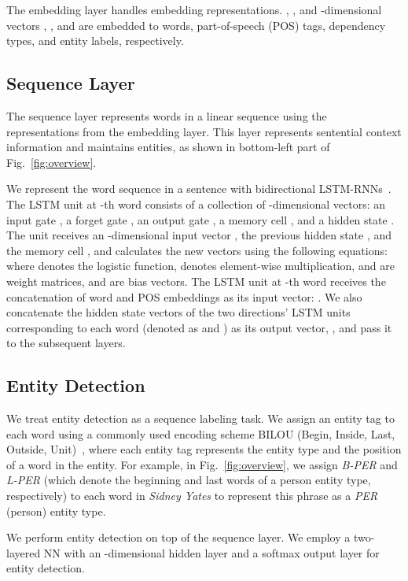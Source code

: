 \documentclass[11pt]{article}
\begin{document}
The embedding layer handles embedding representations. , ,  and -dimensional vectors , ,  and  are
embedded to words, part-of-speech (POS) tags, dependency types, and entity labels, respectively. 

\subsection{Sequence Layer}

The sequence layer represents words in a linear sequence using the representations from the embedding layer. This layer represents sentential context information and maintains entities, as shown in bottom-left part of Fig.~\ref{fig:overview}.

We represent the word sequence in a sentence with bidirectional LSTM-RNNs~\cite{graves2013speech}.
The LSTM unit at -th word consists of a collection of -dimensional
vectors: an input gate , a forget gate , an output gate , a
memory cell , and a hidden state .
The unit receives an -dimensional input vector , the previous hidden state , and the memory cell , and calculates the new vectors using the following equations:
\vspace{-0.15cm}
where  denotes the logistic function,  denotes element-wise multiplication,  and  are weight matrices, and  are bias vectors.
The LSTM unit at -th word receives the concatenation of word and POS embeddings as its input vector: .
We also concatenate the hidden state vectors of the two directions' LSTM units corresponding to each word (denoted as  and ) as its output vector, , and pass it to the subsequent layers.

\subsection{Entity Detection}

We treat entity detection as a sequence labeling task. We assign an entity tag to each word using a commonly used encoding scheme BILOU (Begin, Inside, Last, Outside, Unit)~\cite{ratinov-roth:2009:CoNLL}, where each entity tag represents the entity type and the position of a word in the entity. For example, in Fig.~\ref{fig:overview}, we assign {\it B-PER} and {\it L-PER} (which denote the beginning and last words of a person entity type, respectively) to each word in {\it Sidney Yates} to represent this phrase as a {\it PER} (person) entity type.

We perform entity detection on top of the sequence layer. We employ a two-layered NN with an -dimensional hidden layer  and a softmax output layer for entity detection.
\end{document}
